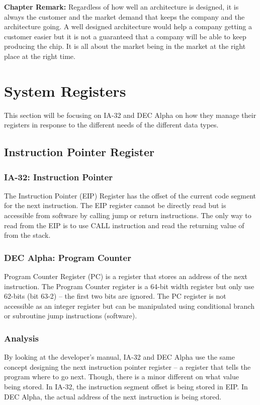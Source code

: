 \documentclass[letterpaper,10pt,titlepage]{article}
\begin{document}
\textbf{Chapter Remark:}
Regardless of how well an architecture is designed, it is always the customer
and the market demand that keeps the company and the architecture going. 
A well designed architecture would help a company getting a customer
easier but it is not a guaranteed that a company will be able to keep 
producing the chip. It is all about the market being in the market  at the 
right place at the right time.


\section{System Registers}
This section will be focusing on IA-32 and DEC Alpha on how they manage
their registers in response to the different needs of the different data types.
\subsection{Instruction Pointer Register}

\subsubsection{IA-32: Instruction Pointer}
The Instruction Pointer (EIP) Register has the offset of the current code segment
for the next instruction. The EIP register cannot be directly read but is 
accessible from software by calling jump or return instructions. The only way 
to read from the EIP is to use CALL instruction and read the returning value
of from the stack.

\subsubsection{DEC Alpha: Program Counter}
Program Counter Register (PC) is a register that stores an address of the next 
instruction. The Program Counter register is a 64-bit width register but only
use 62-bits (bit 63-2) -- the first two bits are ignored. The PC register is
not accessible as an integer register but can be manipulated using 
conditional branch or subroutine jump instructions (software).

\subsubsection{Analysis}
By looking at the developer's manual, IA-32 and DEC Alpha use the same concept  
designing the next instruction pointer register -- a register that tells the
program where to go next. Though, there is a minor different on 
what value being stored. In IA-32, the instruction segment offset is
being stored in EIP. In DEC Alpha, the actual address of the next instruction
is being stored. 
\end{document}
